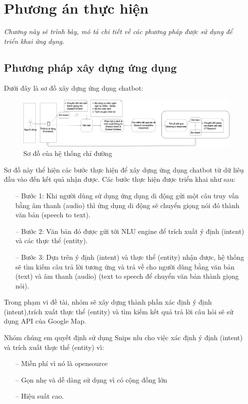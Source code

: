 \chapter{Phương án thực hiện}
\label{Chapter4}

\emph{Chương này sẽ trình bày, mô tả chi tiết về các phương pháp được sử dụng để triển khai ứng dụng.}


\section{Phương pháp xây dựng ứng dụng}
Dưới đây là sơ đồ xây dựng ứng dụng chatbot:
\begin{figure}[htp]
    \centering
    \includegraphics[width=15cm]{images/Structure-description.png}
    \caption{Sơ đồ của hệ thống chỉ đường}
    \label{fig:sodohethongchiduong}

\end{figure}

Sơ đồ này thể hiện các bước thực hiện để xây dựng ứng dụng chatbot từ dữ liêụ đầu vào đến kết quả nhận được. Các bước thực hiện được triển khai như sau:
\begin{itemize}
    \item[--] Bước 1: Khi người dùng sử dụng ứng dụng di động gửi một câu truy vấn bằng âm thanh (audio) thì ứng dụng di động sẽ chuyển giọng nói đó thành văn bản (speech to text).
    \item[--] Bước 2: Văn bản đó được gửi tới NLU engine để trích xuất ý định (intent) và các thực thể (entity).
    \item[--] Bước 3: Dựa trên ý định (intent) và thực thể (entity) nhận được, hệ thống sẽ tìm kiếm câu trả lời tương ứng và trả về cho người dùng bằng văn bản (text) và âm thanh (audio) (text to speech để chuyển văn bản thành giọng nói).
\end{itemize}
Trong phạm vi đề tài, nhóm sẽ xây dựng thành phần xác định ý định (intent),trích xuất thực thể (entity) và tìm kiếm kết quả trả lời câu hỏi sẽ sử dụng API của Google Map.

Nhóm chúng em quyết định sử dụng Snips \ac{nlu} cho việc xác định ý định (intent) và trích xuất thực thể (entity) vì:
\begin{itemize}
    \item[--] Miễn phí vì nó là opensource
    \item[--] Gọn nhẹ và dễ dàng sử dụng vì có cộng đồng lớn
    \item[--] Hiệu suất cao.
\end{itemize}

